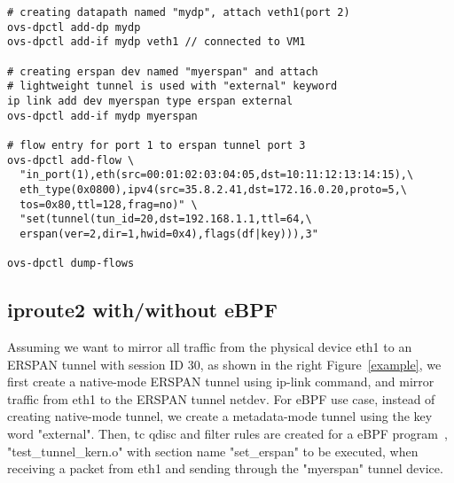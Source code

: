 \documentclass[10pt]{sigplanconf}
\begin{document}
{\footnotesize
\begin{verbatim}
# creating datapath named "mydp", attach veth1(port 2)
ovs-dpctl add-dp mydp
ovs-dpctl add-if mydp veth1 // connected to VM1

# creating erspan dev named "myerspan" and attach
# lightweight tunnel is used with "external" keyword
ip link add dev myerspan type erspan external
ovs-dpctl add-if mydp myerspan

# flow entry for port 1 to erspan tunnel port 3 
ovs-dpctl add-flow \
  "in_port(1),eth(src=00:01:02:03:04:05,dst=10:11:12:13:14:15),\
  eth_type(0x0800),ipv4(src=35.8.2.41,dst=172.16.0.20,proto=5,\
  tos=0x80,ttl=128,frag=no)" \
  "set(tunnel(tun_id=20,dst=192.168.1.1,ttl=64,\
  erspan(ver=2,dir=1,hwid=0x4),flags(df|key))),3"

ovs-dpctl dump-flows
\end{verbatim}
}

\subsection{iproute2 with/without eBPF}\label{iproute2}
Assuming we want to mirror all traffic from the physical device eth1
to an ERSPAN tunnel with session ID 30, as shown in the right Figure~\ref{example},
we first create a native-mode ERSPAN tunnel using ip-link command,
and mirror traffic from eth1 to the ERSPAN tunnel netdev.
For eBPF use case, instead of creating native-mode tunnel, we create
a metadata-mode tunnel using the key word "external".
Then, tc qdisc and filter rules are created for a eBPF program~\cite{daniel1,daniel2},
"test\_tunnel\_kern.o" with section name "set\_erspan" to be executed,
when receiving a packet from eth1 and sending through the "myerspan"
tunnel device.

\end{document}
